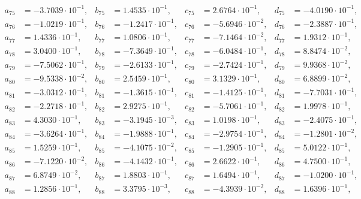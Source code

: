\begin{align*}
  a_{ 75 } &= -3.7039 \cdot 10^{ -1 }, & b_{ 75 } &= 1.4535 \cdot 10^{ -1 }, & c_{ 75 } &= 2.6764 \cdot 10^{ -1 }, & d_{ 75 } &= -4.0190 \cdot 10^{ -1 }, \\ 
  a_{ 76 } &= -1.0219 \cdot 10^{ -1 }, & b_{ 76 } &= -1.2417 \cdot 10^{ -1 }, & c_{ 76 } &= -5.6946 \cdot 10^{ -2 }, & d_{ 76 } &= -2.3887 \cdot 10^{ -1 }, \\ 
  a_{ 77 } &= 1.4336 \cdot 10^{ -1 }, & b_{ 77 } &= 1.0806 \cdot 10^{ -1 }, & c_{ 77 } &= -7.1464 \cdot 10^{ -2 }, & d_{ 77 } &= 1.9312 \cdot 10^{ -1 }, \\ 
  a_{ 78 } &= 3.0400 \cdot 10^{ -1 }, & b_{ 78 } &= -7.3649 \cdot 10^{ -1 }, & c_{ 78 } &= -6.0484 \cdot 10^{ -1 }, & d_{ 78 } &= 8.8474 \cdot 10^{ -2 }, \\ 
  a_{ 79 } &= -7.5062 \cdot 10^{ -1 }, & b_{ 79 } &= -2.6133 \cdot 10^{ -1 }, & c_{ 79 } &= -2.7424 \cdot 10^{ -1 }, & d_{ 79 } &= 9.9368 \cdot 10^{ -2 }, \\ 
  a_{ 80 } &= -9.5338 \cdot 10^{ -2 }, & b_{ 80 } &= 2.5459 \cdot 10^{ -1 }, & c_{ 80 } &= 3.1329 \cdot 10^{ -1 }, & d_{ 80 } &= 6.8899 \cdot 10^{ -2 }, \\ 
  a_{ 81 } &= -3.0312 \cdot 10^{ -1 }, & b_{ 81 } &= -1.3615 \cdot 10^{ -1 }, & c_{ 81 } &= -1.4125 \cdot 10^{ -1 }, & d_{ 81 } &= -7.7031 \cdot 10^{ -1 }, \\ 
  a_{ 82 } &= -2.2718 \cdot 10^{ -1 }, & b_{ 82 } &= 2.9275 \cdot 10^{ -1 }, & c_{ 82 } &= -5.7061 \cdot 10^{ -1 }, & d_{ 82 } &= 1.9978 \cdot 10^{ -1 }, \\ 
  a_{ 83 } &= 4.3030 \cdot 10^{ -1 }, & b_{ 83 } &= -3.1945 \cdot 10^{ -3 }, & c_{ 83 } &= 1.0198 \cdot 10^{ -1 }, & d_{ 83 } &= -2.4075 \cdot 10^{ -1 }, \\ 
  a_{ 84 } &= -3.6264 \cdot 10^{ -1 }, & b_{ 84 } &= -1.9888 \cdot 10^{ -1 }, & c_{ 84 } &= -2.9754 \cdot 10^{ -1 }, & d_{ 84 } &= -1.2801 \cdot 10^{ -2 }, \\ 
  a_{ 85 } &= 1.5259 \cdot 10^{ -1 }, & b_{ 85 } &= -4.1075 \cdot 10^{ -2 }, & c_{ 85 } &= -1.2905 \cdot 10^{ -1 }, & d_{ 85 } &= 5.0122 \cdot 10^{ -1 }, \\ 
  a_{ 86 } &= -7.1220 \cdot 10^{ -2 }, & b_{ 86 } &= -4.1432 \cdot 10^{ -1 }, & c_{ 86 } &= 2.6622 \cdot 10^{ -1 }, & d_{ 86 } &= 4.7500 \cdot 10^{ -1 }, \\ 
  a_{ 87 } &= 6.8749 \cdot 10^{ -2 }, & b_{ 87 } &= 1.8803 \cdot 10^{ -1 }, & c_{ 87 } &= 1.6494 \cdot 10^{ -1 }, & d_{ 87 } &= -1.0200 \cdot 10^{ -1 }, \\ 
  a_{ 88 } &= 1.2856 \cdot 10^{ -1 }, & b_{ 88 } &= 3.3795 \cdot 10^{ -3 }, & c_{ 88 } &= -4.3939 \cdot 10^{ -2 }, & d_{ 88 } &= 1.6396 \cdot 10^{ -1 }, \\ 

\end{align*}
